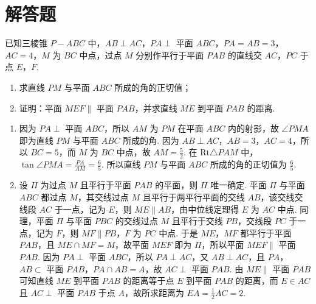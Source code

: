 \section{解答题}

\begin{problem}
已知三棱锥 \(P-ABC\) 中，\(AB\perp AC\)，\(PA\perp\) 平面 \(ABC\)，\(PA=AB=3\)，\(AC=4\)，\(M\) 为 \(BC\) 中点，过点 \(M\) 分别作平行于平面 \(PAB\) 的直线交 \(AC\)，\(PC\) 于点 \(E\)，\(F\).

\begin{enumerate}
\item 求直线 \(PM\) 与平面 \(ABC\) 所成的角的正切值；
\item 证明：平面 \(MEF\parallel\) 平面 \(PAB\)，并求直线 \(ME\) 到平面 \(PAB\) 的距离.
\end{enumerate}

\end{problem}

\begin{solution}
\begin{enumerate}
\item 因为 \(PA\perp\) 平面 \(ABC\)，所以 \(AM\) 为 \(PM\) 在平面 \(ABC\) 内的射影，故 \(\angle PMA\) 即为直线 \(PM\) 与平面 \(ABC\) 所成的角. 因为 \(AB\perp AC\)，\(AB=3\)，\(AC=4\)，所以 \(BC=5\)，而 \(M\) 为 \(BC\) 中点，故 \(AM=\frac{5}{2}\). 在 \(\mathrm{Rt}\triangle PAM\) 中，\(\tan\angle PMA=\frac{PA}{AM}=\frac{6}{5}\). 所以直线 \(PM\) 与平面 \(ABC\) 所成的角的正切值为 \(\frac{6}{5}\).
\item 设 \(\Pi\) 为过点 \(M\) 且平行于平面 \(PAB\) 的平面，则 \(\Pi\) 唯一确定. 平面 \(\Pi\) 与平面 \(ABC\) 都过点 \(M\)，其交线过点 \(M\) 且平行于两平行平面的交线 \(AB\)，该交线交线段 \(AC\) 于一点，记为 \(E\)，则 \(ME\parallel AB\)，由中位线定理得 \(E\) 为 \(AC\) 中点. 同理，平面 \(\Pi\) 与平面 \(PBC\) 的交线过点 \(M\) 且平行于交线 \(PB\)，交线段 \(PC\) 于一点，记为 \(F\)，则 \(MF\parallel PB\)，\(F\) 为 \(PC\) 中点. 于是 \(ME\)，\(MF\) 都平行于平面 \(PAB\)，且 \(ME\cap MF=M\)，故平面 \(MEF\) 即为 \(\Pi\)，所以平面 \(MEF\parallel\) 平面 \(PAB\). 因为 \(PA\perp\) 平面 \(ABC\)，所以 \(PA\perp AC\)，又 \(AB\perp AC\)，且 \(PA\)，\(AB\subset\) 平面 \(PAB\)，\(PA\cap AB=A\)，故 \(AC\perp\) 平面 \(PAB\). 由 \(ME\parallel\) 平面 \(PAB\) 可知直线 \(ME\) 到平面 \(PAB\) 的距离等于点 \(E\) 到平面 \(PAB\) 的距离，而 \(E\in AC\) 且 \(AC\perp\) 平面 \(PAB\) 于点 \(A\)，故所求距离为 \(EA=\frac{1}{2}AC=2\).
\end{enumerate}
\end{solution}

